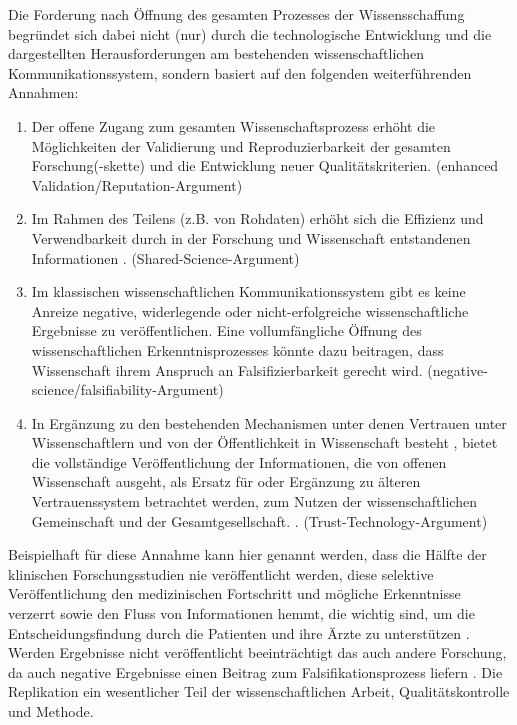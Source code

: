 Die Forderung nach Öffnung des gesamten Prozesses der Wissensschaffung begründet sich dabei nicht (nur) durch die technologische Entwicklung und die dargestellten Herausforderungen am bestehenden wissenschaftlichen Kommunikationssystem, sondern basiert auf den folgenden weiterführenden Annahmen:
\begin{enumerate}
\item Der offene Zugang zum gesamten Wissenschaftsprozess erhöht die Möglichkeiten der Validierung und Reproduzierbarkeit der gesamten Forschung(-skette) \cite{Aleksic_2014} \cite{Krumholz_2014} \cite{hey_2015_open} und die Entwicklung neuer Qualitätskriterien. (enhanced Validation/Reputation-Argument)
\item Im Rahmen des Teilens (z.B. von Rohdaten) erhöht sich die Effizienz und Verwendbarkeit durch in der Forschung und Wissenschaft entstandenen Informationen \cite{Fecher_2015}. (Shared-Science-Argument)
\item Im klassischen wissenschaftlichen Kommunikationssystem gibt es keine Anreize negative, widerlegende oder nicht-erfolgreiche wissenschaftliche Ergebnisse zu veröffentlichen. Eine vollumfängliche Öffnung des wissenschaftlichen Erkenntnisprozesses könnte dazu beitragen, dass Wissenschaft ihrem Anspruch an Falsifizierbarkeit gerecht wird. (negative-science/falsifiability-Argument)
\item In Ergänzung zu den bestehenden Mechanismen unter denen Vertrauen unter Wissenschaftlern und von der Öffentlichkeit in Wissenschaft besteht \cite{weingart_2005_wissenschaft}, bietet die vollständige Veröffentlichung der Informationen, die von offenen Wissenschaft ausgeht, als Ersatz für oder Ergänzung zu älteren Vertrauenssystem betrachtet werden, zum Nutzen der wissenschaftlichen Gemeinschaft und der Gesamtgesellschaft. \cite{grand_2012_open}.  (Trust-Technology-Argument)
\end{enumerate}

Beispielhaft für diese Annahme kann hier genannt werden, dass die Hälfte der klinischen Forschungsstudien nie veröffentlicht werden, diese selektive Veröffentlichung den medizinischen Fortschritt und mögliche Erkenntnisse verzerrt sowie den Fluss von Informationen hemmt, die wichtig sind, um die Entscheidungsfindung durch die Patienten und ihre Ärzte zu unterstützen \cite{Ross_2013}. Werden Ergebnisse nicht veröffentlicht beeinträchtigt das auch andere Forschung, da auch negative Ergebnisse einen Beitrag zum Falsifikationsprozess liefern \cite{nosek_2012_scientific}. Die Replikation ein wesentlicher Teil der wissenschaftlichen Arbeit, Qualitätskontrolle und Methode.

